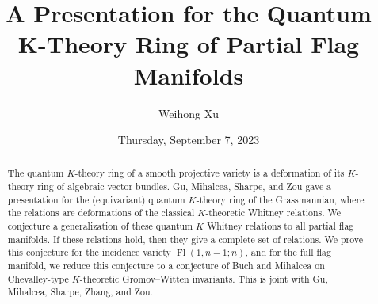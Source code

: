\documentclass{UAmathtalk}
\author{Weihong Xu}
\title{A Presentation for the Quantum K-Theory Ring of Partial Flag Manifolds}
\date{Thursday, September 7, 2023}
\begin{document}
\maketitle

\begin{abstract}
The quantum $K$-theory ring of a smooth projective variety is a deformation of its $K$-theory ring of algebraic vector bundles. Gu, Mihalcea, Sharpe, and Zou gave a presentation for the (equivariant) quantum $K$-theory ring of the Grassmannian, where the relations are deformations of the classical $K$-theoretic Whitney relations. We conjecture a generalization of these quantum $K$ Whitney relations to all partial flag manifolds. If these relations hold, then they give a complete set of relations. We prove this conjecture for the incidence variety $\operatorname{Fl}(1,n-1;n)$, and for the full flag manifold, we reduce this conjecture to a conjecture of Buch and Mihalcea on Chevalley-type $K$-theoretic Gromov--Witten invariants. This is joint with Gu, Mihalcea, Sharpe, Zhang, and Zou.
\end{abstract}
\end{document}
